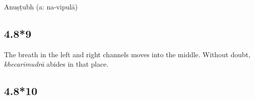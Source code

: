 \begin{ekdosis}
\begin{metre}[hp04_008_8]
Anuṣṭubh (a: na-vipulā)
\end{metre}

\subsection*{4.8*9}
\begin{translation}[hp04_008_9]
The breath in the left and right channels moves into the middle. Without doubt, \emph{khecarīmudrā} abides in that place.
\end{translation}




\subsection*{4.8*10}



\end{ekdosis}
